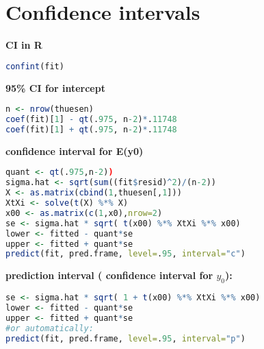 \section{Confidence intervals}
\textbf{CI in R} \begin{lstlisting}[language=R]
confint(fit) \end{lstlisting}
\textbf{95\% CI for intercept} \begin{lstlisting}[language=R]
n <- nrow(thuesen)
coef(fit)[1] - qt(.975, n-2)*.11748
coef(fit)[1] + qt(.975, n-2)*.11748
\end{lstlisting}
\textbf{confidence interval for E(y0)}
\begin{lstlisting}[language=R]
quant <- qt(.975,n-2))
sigma.hat <- sqrt(sum((fit$resid)^2)/(n-2))
X <- as.matrix(cbind(1,thuesen[,1]))
XtXi <- solve(t(X) %*% X)
x00 <- as.matrix(c(1,x0),nrow=2)
se <- sigma.hat * sqrt( t(x00) %*% XtXi %*% x00)
lower <- fitted - quant*se
upper <- fitted + quant*se
predict(fit, pred.frame, level=.95, interval="c")\end{lstlisting}
\textbf{prediction interval ( confidence interval for $y_0$): } \begin{lstlisting}[language = R]
se <- sigma.hat * sqrt( 1 + t(x00) %*% XtXi %*% x00)
lower <- fitted - quant*se
upper <- fitted + quant*se
#or automatically: 
predict(fit, pred.frame, level=.95, interval="p")
\end{lstlisting}
